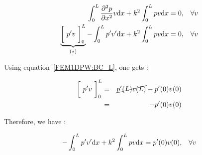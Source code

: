 \documentclass[a4paper, 11pt]{article}
\begin{document}
	\begin{eqnarray*}
		\int_0^L\frac{\partial^2p}{\partial x^2}v\mathrm{d}x + k^2\int_0^L pv\mathrm{d}x = 0 ,&& \forall v \\
		\underbrace{\bigg[~p'v~\bigg]_0^L}_{(*)}-\int_0^Lp'v'\mathrm{d}x + k^2\int_0^Lpv\mathrm{d}x = 0, && \forall v
	\end{eqnarray*}

	Using equation~\eqref{FEM1DPW:BC_L}, one gets :

	\begin{eqnarray*}
		\bigg[~p'v~\bigg]_0^L & = & \cancel{p'(L)v(L)} - p'(0)v(0)\\
							  & = & - p'(0)v(0)
	\end{eqnarray*}

	Therefore, we have :

	\begin{eqnarray}
		-\int_0^Lp'v'\mathrm{d}x + k^2\int_0^Lpv\mathrm{d}x = p'(0)v(0), && \forall v \label{FEM1DPW:FV}
	\end{eqnarray}
\end{document}
